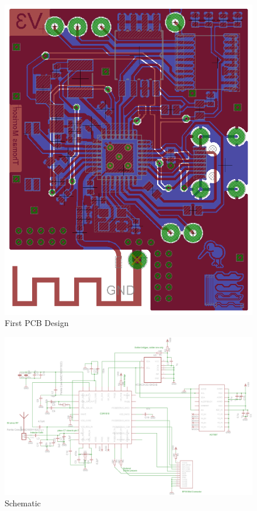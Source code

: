 \documentclass[]{article}
\begin{document}
\begin{figure}[H]
	\begin{center}
		\includegraphics[width = \textwidth]{boardv1}
	\end{center}
	\caption{First PCB Design}
	\label{fig:boardv1}
\end{figure}

\begin{figure}[H]
	\begin{center}
		\includegraphics[width = 1.6\textwidth, angle = 90]{Schematic}
	\end{center}
	\caption{Schematic}
	\label{fig:schematic}
\end{figure}
\end{document}
